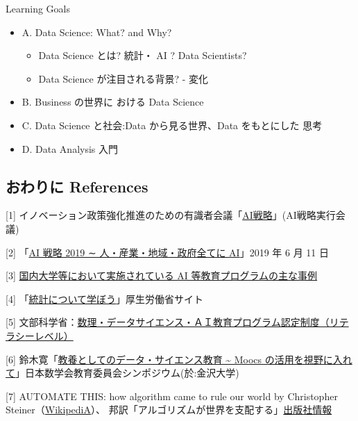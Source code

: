 \documentclass[
]{bxjsbook}
\providecommand{\tightlist}{%
  \setlength{\itemsep}{0pt}\setlength{\parskip}{0pt}}
\theoremstyle{definition}
\theoremstyle{definition}
\theoremstyle{definition}
\theoremstyle{definition}
\theoremstyle{remark}
\begin{document}
Learning Goals

\begin{itemize}
\tightlist
\item
  A. Data Science: What? and Why?

  \begin{itemize}
  \tightlist
  \item
    Data Science とは? 統計・ AI ? Data Scientists?
  \item
    Data Science が注目される背景? - 変化
  \end{itemize}
\item
  B. Business の世界に おける Data Science
\item
  C. Data Science と社会:Data から見る世界、Data をもとにした 思考
\item
  D. Data Analysis 入門
\end{itemize}

\hypertarget{ux304aux308fux308aux306b-references}{%
\subsection{おわりに References}\label{ux304aux308fux308aux306b-references}}

{[}1{]} イノベーション政策強化推進のための有識者会議「\href{https://www8.cao.go.jp/cstp/ai/index.html}{AI戦略}」(AI戦略実行会議)

{[}2{]} 「\href{https://www5.cao.go.jp/keizai-shimon/kaigi/special/reform/wg7/20191101/shiryou1.pdf}{AI 戦略 2019 ∼ 人・産業・地域・政府全てに AI}」2019 年 6 月 11 日

{[}3{]} \href{https://www8.cao.go.jp/cstp/ai/suuri/r1_1kai/r1_1kai.html}{国内大学等において実施されている AI 等教育プログラムの主な事例}

{[}4{]} 「\href{https://www.mhlw.go.jp/toukei/learning/index.html}{統計について学ぼう}」厚生労働省サイト

{[}5{]} 文部科学省：\href{https://www.mext.go.jp/a_menu/koutou/suuri_datascience_ai/00002.htm}{数理・データサイエンス・ＡＩ教育プログラム認定制度（リテラシーレベル）}

{[}6{]} 鈴木寛「\href{https://icu-hsuzuki.github.io/science/index-j.html\#msj2019}{教養としてのデータ・サイエンス教育 \textasciitilde{} Moocs の活用を視野に入れて}」日本数学会教育委員会シンポジウム(於:金沢大学)

{[}7{]} AUTOMATE THIS: how algorithm came to rule our world by Christopher Steiner（\href{https://en.wikipedia.org/wiki/Automate_This}{WikipediA}）、 邦訳「アルゴリズムが世界を支配する」\href{https://www.kadokawa.co.jp/product/321306000181/}{出版社情報}
\end{document}

